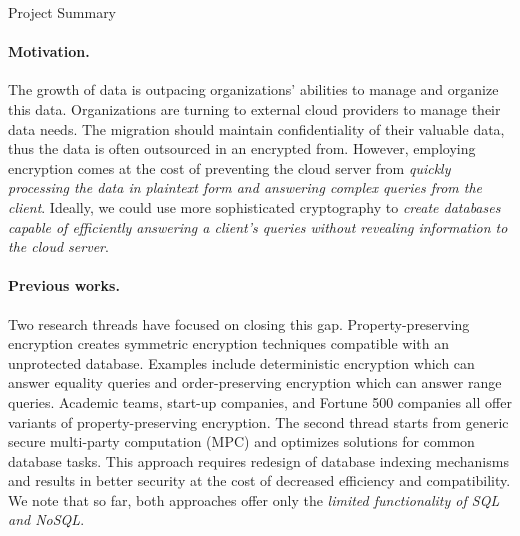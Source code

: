 \documentclass[11pt]{article}
\begin{document}
\begin{center}
\LARGE
Project Summary 
\end{center}

\vspace{-1.5em}
\noindent \hrulefill



\paragraph{Motivation.}
%
The growth of data is outpacing organizations' abilities to manage and
organize this data. Organizations are turning to external cloud providers
to manage their data needs.  
%
The migration should maintain confidentiality of their
valuable data, thus the data is often outsourced in an encrypted from. 
%
However, employing encryption comes at the cost of preventing the cloud server
from {\em quickly processing the data in plaintext form and answering
complex queries from the client}. 
%
Ideally, we could use more sophisticated cryptography to {\em create databases
capable of efficiently answering a client's queries without revealing
information to the cloud server}.  

\paragraph{Previous works.}
Two research threads have focused on closing this gap.
Property-preserving encryption creates symmetric encryption techniques
compatible with an unprotected database. Examples include deterministic
encryption which can answer equality queries and order-preserving encryption
which can answer range queries. Academic teams, start-up companies, and Fortune
500 companies all offer variants of property-preserving encryption.
%
The second thread starts from generic secure multi-party computation (MPC) and
optimizes solutions for common database tasks. This approach requires redesign
of database indexing mechanisms and results in better security at the cost of
decreased efficiency and compatibility. 
%
We note that so far, both approaches offer only the {\em limited functionality
of SQL and NoSQL}. 
\end{document}
